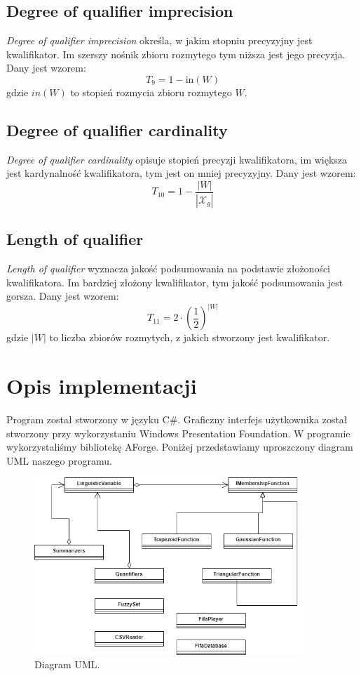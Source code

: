 \documentclass{classrep}
\begin{document}
	\subsection{Degree of qualifier imprecision}
\textsl{Degree of qualifier imprecision} określa, w jakim stopniu precyzyjny jest kwalifikator. Im szerszy nośnik zbioru rozmytego tym niższa jest jego precyzja. Dany jest wzorem:
\begin{equation}
T_9 = 1-\mathrm{in}(W)
\end{equation}
gdzie $in(W)$ to stopień rozmycia zbioru rozmytego $W$.


	\subsection{Degree of qualifier cardinality}
\textsl{Degree of qualifier cardinality} opisuje stopień precyzji kwalifikatora, im większa jest kardynalność kwalifikatora, tym jest on mniej precyzyjny. Dany jest wzorem:
\begin{equation}
T_{10} = 1-\frac{|W|}{|\mathcal{X}_g|}
\end{equation}


	\subsection{Length of qualifier}
\textsl{Length of qualifier} wyznacza jakość podsumowania na podstawie złożoności kwalifikatora. Im bardziej złożony kwalifikator, tym jakość podsumowania jest gorsza. Dany jest wzorem:
\begin{equation}
T_{11} = 2 \cdot \left(\frac{1}{2}\right)^{|W|}
\end{equation}
gdzie $|W|$ to liczba zbiorów rozmytych, z jakich stworzony jest kwalifikator.


	\newpage
	\section{Opis implementacji} %
	Program został stworzony w języku C\#. Graficzny interfejs użytkownika został stworzony przy wykorzystaniu Windows Presentation Foundation. W programie wykorzystaliśmy bibliotekę AForge. Poniżej przedstawiamy uproszczony diagram UML naszego programu.
	
	\begin{figure}[h!]
		\centering
		\includegraphics[width=0.9\textwidth]{../uml/uml.png}
		\caption{Diagram UML.}
		\label{uml}
	\end{figure}
	
\end{document}
